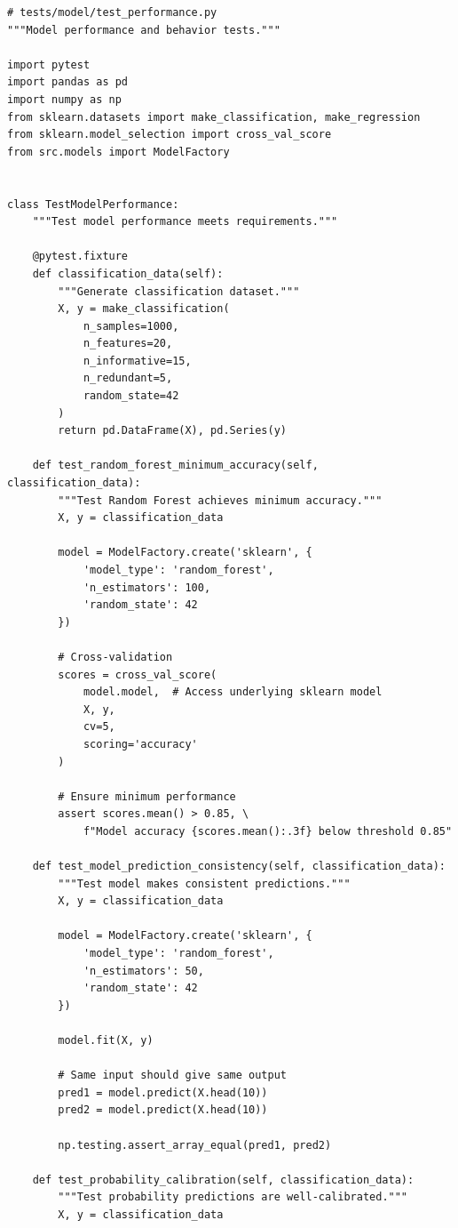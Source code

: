 \begin{lstlisting}[style=python, caption=Tests for model behavior and performance]
# tests/model/test_performance.py
"""Model performance and behavior tests."""

import pytest
import pandas as pd
import numpy as np
from sklearn.datasets import make_classification, make_regression
from sklearn.model_selection import cross_val_score
from src.models import ModelFactory


class TestModelPerformance:
    """Test model performance meets requirements."""

    @pytest.fixture
    def classification_data(self):
        """Generate classification dataset."""
        X, y = make_classification(
            n_samples=1000,
            n_features=20,
            n_informative=15,
            n_redundant=5,
            random_state=42
        )
        return pd.DataFrame(X), pd.Series(y)

    def test_random_forest_minimum_accuracy(self, classification_data):
        """Test Random Forest achieves minimum accuracy."""
        X, y = classification_data

        model = ModelFactory.create('sklearn', {
            'model_type': 'random_forest',
            'n_estimators': 100,
            'random_state': 42
        })

        # Cross-validation
        scores = cross_val_score(
            model.model,  # Access underlying sklearn model
            X, y,
            cv=5,
            scoring='accuracy'
        )

        # Ensure minimum performance
        assert scores.mean() > 0.85, \
            f"Model accuracy {scores.mean():.3f} below threshold 0.85"

    def test_model_prediction_consistency(self, classification_data):
        """Test model makes consistent predictions."""
        X, y = classification_data

        model = ModelFactory.create('sklearn', {
            'model_type': 'random_forest',
            'n_estimators': 50,
            'random_state': 42
        })

        model.fit(X, y)

        # Same input should give same output
        pred1 = model.predict(X.head(10))
        pred2 = model.predict(X.head(10))

        np.testing.assert_array_equal(pred1, pred2)

    def test_probability_calibration(self, classification_data):
        """Test probability predictions are well-calibrated."""
        X, y = classification_data


\end{lstlisting}
